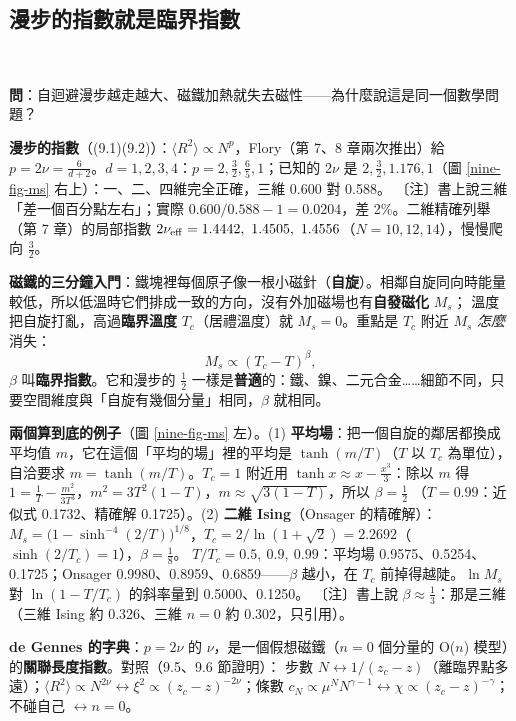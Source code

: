 \subsection{漫步的指數就是臨界指數}
\leavevmode{}\ \par\nopagebreak

\textbf{問}：自迴避漫步越走越大、磁鐵加熱就失去磁性——為什麼說這是同一個數學問題？

\textbf{漫步的指數}（(9.1)(9.2)）：$\langle R^2\rangle\propto N^p$，Flory（第 7、8 章兩次推出）給 $p=2\nu=\frac6{d+2}$。$d=1,2,3,4$：$p=2,\frac32,\frac65,1$；已知的 $2\nu$ 是 $2,\frac32,1.176,1$（圖 \ref{nine-fig-ms} 右上）：一、二、四維完全正確，三維 0.600 對 0.588。
〔注〕書上說三維「差一個百分點左右」；實際 $0.600/0.588-1=0.0204$，差 2\%。二維精確列舉（第 7 章）的局部指數 $2\nu_{\rm eff}=1.4442,\ 1.4505,\ 1.4556$（$N=10,12,14$），慢慢爬向 $\frac32$。

\textbf{磁鐵的三分鐘入門}：鐵塊裡每個原子像一根小磁針（\textbf{自旋}）。相鄰自旋同向時能量較低，所以低溫時它們排成一致的方向，沒有外加磁場也有\textbf{自發磁化} $M_s$；
溫度把自旋打亂，高過\textbf{臨界溫度} $T_c$（居禮溫度）就 $M_s=0$。重點是 $T_c$ 附近 $M_s$ \emph{怎麼}消失：
\[M_s\propto(T_c-T)^\beta,\tag{9.3}\]
$\beta$ 叫\textbf{臨界指數}。它和漫步的 $\frac12$ 一樣是\textbf{普適}的：鐵、鎳、二元合金……細節不同，只要空間維度與「自旋有幾個分量」相同，$\beta$ 就相同。

\textbf{兩個算到底的例子}（圖 \ref{nine-fig-ms} 左）。(1) \textbf{平均場}：把一個自旋的鄰居都換成平均值 $m$，它在這個「平均的場」裡的平均是 $\tanh(m/T)$（$T$ 以 $T_c$ 為單位），自洽要求
$m=\tanh(m/T)$。$T_c=1$ 附近用 $\tanh x\approx x-\frac{x^3}3$：除以 $m$ 得 $1=\frac1T-\frac{m^2}{3T^3}$，$m^2=3T^2(1-T)$，$m\approx\sqrt{3(1-T)}$，所以 $\beta=\frac12$
（$T=0.99$：近似式 0.1732、精確解 0.1725）。(2) \textbf{二維 Ising}（Onsager 的精確解）：$M_s=\big(1-\sinh^{-4}(2/T)\big)^{1/8}$，$T_c=2/\ln(1+\sqrt2)=2.2692$（$\sinh(2/T_c)=1$），$\beta=\frac18$。
$T/T_c=0.5,\ 0.9,\ 0.99$：平均場 0.9575、0.5254、0.1725；Onsager 0.9980、0.8959、0.6859——$\beta$ 越小，在 $T_c$ 前掉得越陡。$\ln M_s$ 對 $\ln(1-T/T_c)$ 的斜率量到 0.5000、0.1250。
〔注〕書上說 $\beta\approx\frac13$：那是三維（三維 Ising 約 0.326、三維 $n=0$ 約 0.302，只引用）。

\textbf{de Gennes 的字典}：$p=2\nu$ 的 $\nu$，是一個假想磁鐵（$n=0$ 個分量的 O($n$) 模型）的\textbf{關聯長度指數}。對照（9.5、9.6 節證明）：
步數 $N\leftrightarrow1/(z_c-z)$（離臨界點多遠）；$\langle R^2\rangle\propto N^{2\nu}\leftrightarrow\xi^2\propto(z_c-z)^{-2\nu}$；條數 $c_N\propto\mu^NN^{\gamma-1}\leftrightarrow\chi\propto(z_c-z)^{-\gamma}$；不碰自己 $\leftrightarrow n=0$。

